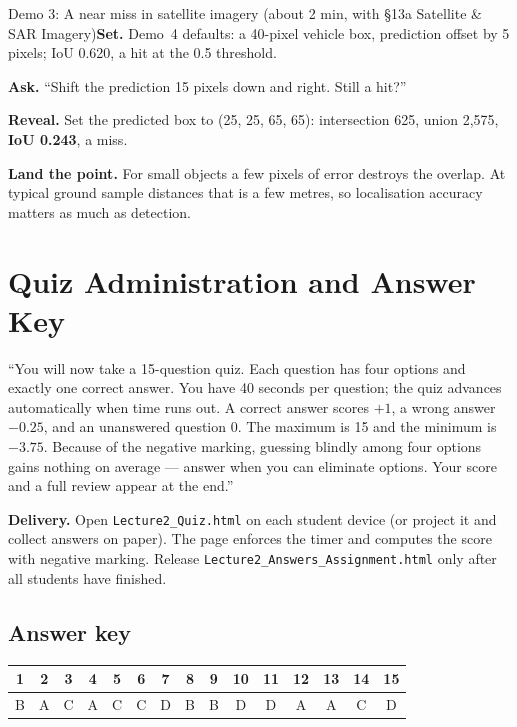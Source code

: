\documentclass[11pt]{article}
\begin{document}
\begin{live}{Demo 3: A near miss in satellite imagery (about 2 min, with \S13a Satellite \& SAR Imagery)}\textbf{Set.} Demo~4 defaults: a 40-pixel vehicle box, prediction offset by 5 pixels; IoU 0.620, a hit at the 0.5 threshold.\par\smallskip\textbf{Ask.} ``Shift the prediction 15 pixels down and right. Still a hit?''\par\smallskip\textbf{Reveal.} Set the predicted box to (25, 25, 65, 65): intersection 625, union 2,575, \textbf{IoU 0.243}, a miss.\par\smallskip\textbf{Land the point.} For small objects a few pixels of error destroys the overlap. At typical ground sample distances that is a few metres, so localisation accuracy matters as much as detection.\end{live}

\section{Quiz Administration and Answer Key}

\begin{sayit}``You will now take a 15-question quiz. Each question has four options and exactly one correct answer. You have 40 seconds per question; the quiz advances automatically when time runs out. A correct answer scores $+1$, a wrong answer $-0.25$, and an unanswered question 0. The maximum is 15 and the minimum is $-3.75$. Because of the negative marking, guessing blindly among four options gains nothing on average --- answer when you can eliminate options. Your score and a full review appear at the end.''\end{sayit}

\textbf{Delivery.} Open \texttt{Lecture2\_Quiz.html} on each student device (or project it and collect answers on paper). The page enforces the timer and computes the score with negative marking. Release \texttt{Lecture2\_Answers\_Assignment.html} only after all students have finished.

\subsection*{Answer key}\begin{center}\small\renewcommand{\arraystretch}{1.3}\begin{tabular}{|c|c|c|c|c|c|c|c|c|c|c|c|c|c|c|}\hline \textbf{1} & \textbf{2} & \textbf{3} & \textbf{4} & \textbf{5} & \textbf{6} & \textbf{7} & \textbf{8} & \textbf{9} & \textbf{10} & \textbf{11} & \textbf{12} & \textbf{13} & \textbf{14} & \textbf{15}\\\hline B & A & C & A & C & C & D & B & B & D & D & A & A & C & D\\\hline\end{tabular}\end{center}
\end{document}
